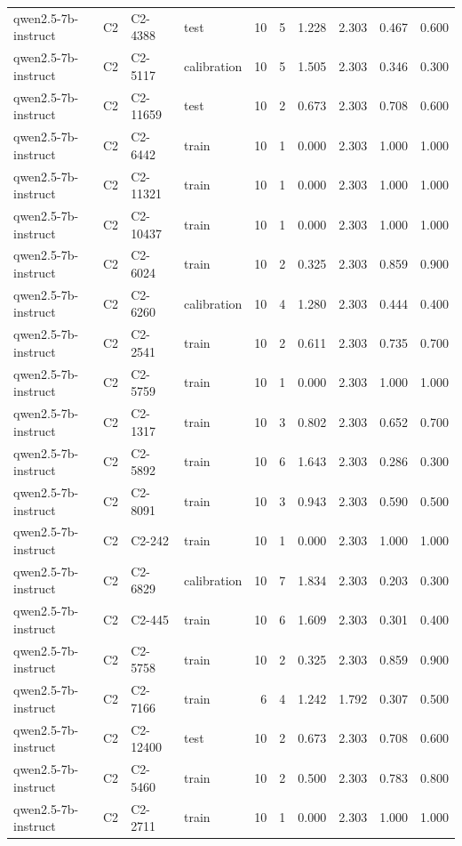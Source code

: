 \begin{table}
\begin{tabular}{llllrrrrrr}
qwen2.5-7b-instruct & C2 & C2-4388 & test & 10 & 5 & 1.228 & 2.303 & 0.467 & 0.600 \\
qwen2.5-7b-instruct & C2 & C2-5117 & calibration & 10 & 5 & 1.505 & 2.303 & 0.346 & 0.300 \\
qwen2.5-7b-instruct & C2 & C2-11659 & test & 10 & 2 & 0.673 & 2.303 & 0.708 & 0.600 \\
qwen2.5-7b-instruct & C2 & C2-6442 & train & 10 & 1 & 0.000 & 2.303 & 1.000 & 1.000 \\
qwen2.5-7b-instruct & C2 & C2-11321 & train & 10 & 1 & 0.000 & 2.303 & 1.000 & 1.000 \\
qwen2.5-7b-instruct & C2 & C2-10437 & train & 10 & 1 & 0.000 & 2.303 & 1.000 & 1.000 \\
qwen2.5-7b-instruct & C2 & C2-6024 & train & 10 & 2 & 0.325 & 2.303 & 0.859 & 0.900 \\
qwen2.5-7b-instruct & C2 & C2-6260 & calibration & 10 & 4 & 1.280 & 2.303 & 0.444 & 0.400 \\
qwen2.5-7b-instruct & C2 & C2-2541 & train & 10 & 2 & 0.611 & 2.303 & 0.735 & 0.700 \\
qwen2.5-7b-instruct & C2 & C2-5759 & train & 10 & 1 & 0.000 & 2.303 & 1.000 & 1.000 \\
qwen2.5-7b-instruct & C2 & C2-1317 & train & 10 & 3 & 0.802 & 2.303 & 0.652 & 0.700 \\
qwen2.5-7b-instruct & C2 & C2-5892 & train & 10 & 6 & 1.643 & 2.303 & 0.286 & 0.300 \\
qwen2.5-7b-instruct & C2 & C2-8091 & train & 10 & 3 & 0.943 & 2.303 & 0.590 & 0.500 \\
qwen2.5-7b-instruct & C2 & C2-242 & train & 10 & 1 & 0.000 & 2.303 & 1.000 & 1.000 \\
qwen2.5-7b-instruct & C2 & C2-6829 & calibration & 10 & 7 & 1.834 & 2.303 & 0.203 & 0.300 \\
qwen2.5-7b-instruct & C2 & C2-445 & train & 10 & 6 & 1.609 & 2.303 & 0.301 & 0.400 \\
qwen2.5-7b-instruct & C2 & C2-5758 & train & 10 & 2 & 0.325 & 2.303 & 0.859 & 0.900 \\
qwen2.5-7b-instruct & C2 & C2-7166 & train & 6 & 4 & 1.242 & 1.792 & 0.307 & 0.500 \\
qwen2.5-7b-instruct & C2 & C2-12400 & test & 10 & 2 & 0.673 & 2.303 & 0.708 & 0.600 \\
qwen2.5-7b-instruct & C2 & C2-5460 & train & 10 & 2 & 0.500 & 2.303 & 0.783 & 0.800 \\
qwen2.5-7b-instruct & C2 & C2-2711 & train & 10 & 1 & 0.000 & 2.303 & 1.000 & 1.000 \\

\end{tabular}
\end{table}
